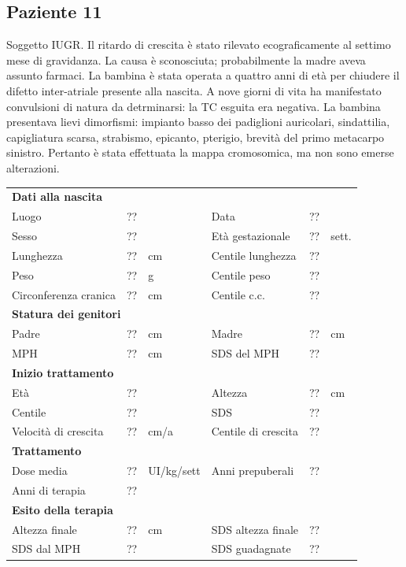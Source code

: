 \subsection*{Paziente 11}%


Soggetto IUGR. Il ritardo di crescita è stato rilevato ecograficamente al settimo mese di gravidanza. La causa è sconosciuta; probabilmente la madre aveva assunto farmaci. La bambina è stata operata a quattro anni di età per chiudere il difetto inter-atriale presente alla nascita. A nove giorni di vita ha manifestato convulsioni di natura da detrminarsi: la TC esguita era negativa. La bambina presentava lievi dimorfismi: impianto basso dei padiglioni auricolari, sindattilia, capigliatura scarsa, strabismo, epicanto, pterigio, brevità del primo metacarpo sinistro. Pertanto è stata effettuata la mappa cromosomica, ma non sono emerse alterazioni.   



\begin{table}[!h]
\begin{tabular}{lrllrl}
\toprule
\multicolumn{6}{l}{\textbf{Dati alla nascita}}\\
Luogo 		& \multicolumn{2}{l}{??} 	& Data 					& \multicolumn{2}{l}{??} 	\\
Sesso 		& \multicolumn{2}{l}{??} 	& Età gestazionale 		& ?? 		& sett.\\
Lunghezza 	& ?? 		& cm 				& Centile lunghezza		& ?? 		\\
Peso 		& ?? 		& g					& Centile peso			& ?? 		\\
Circonferenza cranica	& ?? 		& cm 	& Centile c.c.			& ?? \\
\midrule
\multicolumn{6}{l}{\textbf{Statura dei genitori}}\\
Padre 		& ?? & cm 	& Madre 				& ?? & cm \\
MPH 		& ?? & cm 	& SDS del MPH 			& ??\\
\midrule
\multicolumn{6}{l}{\textbf{Inizio trattamento}} \\
Età	& ?? & 		& Altezza 				& ?? & cm  \\
Centile & ?? 	 &		& SDS		& ?? \\
Velocità di crescita & ?? & cm/a	& Centile di crescita & ??\\
\midrule
\multicolumn{6}{l}{\textbf{Trattamento}} \\
Dose media		& ?? & UI/kg/sett & Anni prepuberali & ??\\
Anni di terapia & ??\\
\midrule
\multicolumn{6}{l}{\textbf{Esito della terapia}} \\
Altezza finale			& ?? & cm 	& SDS altezza finale		& ??\\
SDS dal MPH				& ?? &		& SDS guadagnate 			& ??\\
\bottomrule
\end{tabular}
\end{table}
\clearpage


